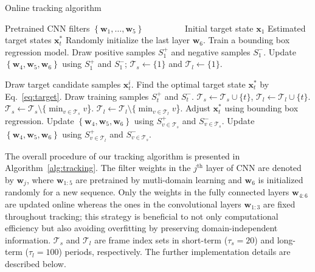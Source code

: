 \documentclass[10pt,twocolumn,letterpaper]{article}
\begin{document}
\begin{algorithm}[t]
\caption{Online tracking algorithm}
\label{alg:tracking}
\begin{algorithmic}[1]
\Require Pretrained CNN filters $\left\{ \mathbf{w}_{1}, \dots, \mathbf{w}_{5}\right\}$
  \Statex ~~~~~~~~~Initial target state $\mathbf{x}_1$
\Ensure Estimated target states $\mathbf{x}_t^*$
\State Randomly initialize the last layer $\mathbf{w}_6$.
\State Train a bounding box regression model.
\State Draw positive samples $S_1^+$ and negative samples $S_1^-$.
\State Update $\left\{\mathbf{w}_4,\mathbf{w}_5,\mathbf{w}_6\right\}$ using $S_1^+$ and $S_1^-$;
\State $\mathcal{T}_s \gets \{1\}$ and $\mathcal{T}_l \gets \{1\}$.

\Repeat
    \State Draw target candidate samples $\mathbf{x}_t^i$.
    \State Find the optimal target state $\mathbf{x}_t^*$ by Eq.~\eqref{eq:target}.
        \State Draw training samples $S_t^+$ and $S_t^-$.
        \State $\mathcal{T}_s \gets \mathcal{T}_s \cup \{t\}$, $\mathcal{T}_l \gets \mathcal{T}_l \cup \{t\}$.
         $\mathcal{T}_s \gets \mathcal{T}_s \setminus \{\min_{v\in \mathcal{T}_s} v$\}. \EndIf
         $\mathcal{T}_l \gets \mathcal{T}_l \setminus \{\min_{v\in \mathcal{T}_l} v$\}. \EndIf
        \State Adjust $\mathbf{x}_t^*$ using bounding box regression.
    \EndIf
{}
    \State Update $\left\{\mathbf{w}_4,\mathbf{w}_5,\mathbf{w}_6\right\}$ using $S^+_{v\in\mathcal{T}_s}$ and $S^-_{v\in\mathcal{T}_s}$.
    \State Update $\left\{\mathbf{w}_4,\mathbf{w}_5,\mathbf{w}_6\right\}$ using $S^+_{v\in\mathcal{T}_l}$ and $S^-_{v\in\mathcal{T}_s}$.
\EndIf  
{}
\end{algorithmic}
\end{algorithm}

The overall procedure of our tracking algorithm is presented in Algorithm~\ref{alg:tracking}. 
The filter weights in the $j^{\text{th}}$ layer of CNN are denoted by $\mathbf{w}_j$, where $\mathbf{w}_{1:5}$ are pretrained by mutli-domain learning and $\mathbf{w}_6$ is initialized randomly for a new sequence.
Only the weights in the fully connected layers $\mathbf{w}_{4:6}$ are updated online whereas the ones in the convolutional layers $\mathbf{w}_{1:3}$ are fixed throughout tracking; this strategy is beneficial to not only  computational efficiency but also avoiding overfitting by preserving domain-independent information. 
$\mathcal{T}_s$ and $\mathcal{T}_l$ are frame index sets in short-term ($\tau_s=20$) and long-term ($\tau_l=100$) periods, respectively.
The further implementation details are described below.
\end{document}
